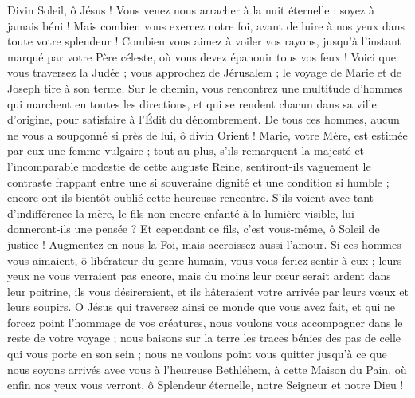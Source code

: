 \documentclass[%
fontsize=10%
,a6paper%
,DIV=15%
]{scrartcl}
\begin{document}
Divin Soleil, ô Jésus ! Vous venez nous arracher à la nuit éternelle : soyez à jamais béni ! Mais combien vous exercez notre foi, avant de luire à nos yeux dans toute votre splendeur ! Combien vous aimez à voiler vos rayons, jusqu’à l’instant marqué par votre Père céleste, où vous devez épanouir tous vos feux ! Voici que vous traversez la Judée ; vous approchez de Jérusalem ; le voyage de Marie et de Joseph tire à son terme. Sur le chemin, vous rencontrez une multitude d’hommes qui marchent en toutes les directions, et qui se rendent chacun dans sa ville d’origine, pour satisfaire à l’Édit du dénombrement. De tous ces hommes, aucun ne vous a soupçonné si près de lui, ô divin Orient ! Marie, votre Mère, est estimée par eux une femme vulgaire ; tout au plus, s’ils remarquent la majesté et l’incomparable modestie de cette auguste Reine, sentiront-ils vaguement le contraste frappant entre une si souveraine dignité et une condition si humble ; encore ont-ils bientôt oublié cette heureuse rencontre. S’ils voient avec tant d’indifférence la mère, le fils non encore enfanté à la lumière visible, lui donneront-ils une pensée ? Et cependant ce fils, c’est vous-même, ô Soleil de justice ! Augmentez en nous la Foi, mais accroissez aussi l’amour. Si ces hommes vous aimaient, ô libérateur du genre humain, vous vous feriez sentir à eux ; leurs yeux ne vous verraient pas encore, mais du moins leur cœur serait ardent dans leur poitrine, ils vous désireraient, et ils hâteraient votre arrivée par leurs vœux et leurs soupirs. O Jésus qui traversez ainsi ce monde que vous avez fait, et qui ne forcez point l’hommage de vos créatures, nous voulons vous accompagner dans le reste de votre voyage ; nous baisons sur la terre les traces bénies des pas de celle qui vous porte en son sein ; nous ne voulons point vous quitter jusqu’à ce que nous soyons arrivés avec vous à l’heureuse Bethléhem, à cette Maison du Pain, où enfin nos yeux vous verront, ô Splendeur éternelle, notre Seigneur et notre Dieu !

\end{document}
